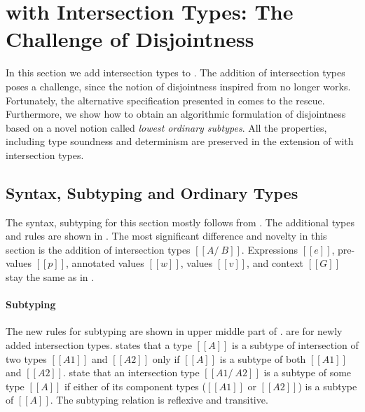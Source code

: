 \section{\cal with Intersection Types: The Challenge of Disjointness}
\label{sec:inter}

In this section we add intersection types to \cal.
The addition of intersection types poses a challenge,
since the notion of disjointness inspired from \citet{oliveira2016disjoint}
no longer works. Fortunately, the alternative specification presented in
 comes to the rescue. Furthermore, we show how to obtain
an algorithmic formulation of disjointness based on a novel notion
called \emph{lowest ordinary subtypes}. All the properties, including
type soundness and determinism are preserved in the extension of \cal
with intersection types.

\subsection{Syntax, Subtyping and Ordinary Types}
\label{sec:inter:system}
The syntax, subtyping for this section mostly follows
from .  The additional types and rules are shown in
.
The most significant difference and novelty in this section
is the addition of intersection types $[[A/\ B]]$.
Expressions $[[e]]$, pre-values $[[p]]$, annotated values $[[w]]$,
values $[[v]]$, and context $[[G]]$ stay the same as in .

\paragraph{Subtyping}
The new rules for subtyping are shown in upper middle part of
.   are for newly
added intersection types.  states that a type $[[A]]$ is
a subtype of intersection of two types $[[A1]]$ and $[[A2]]$ only if
$[[A]]$ is a subtype of both $[[A1]]$ and $[[A2]]$.  state that an intersection type $[[A1 /\ A2]]$ is a subtype
of some type $[[A]]$ if either of its component types ($[[A1]]$ or
$[[A2]]$) is a subtype of $[[A]]$. The subtyping relation is reflexive
and transitive.

